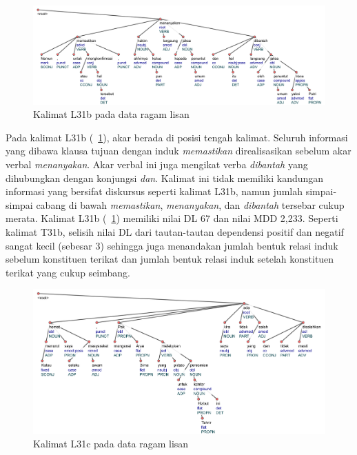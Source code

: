 \begin{figure}
	\centering \includegraphics[width=1
	\textwidth] {pics/ls16.jpg} 
	\caption{Kalimat L31b pada data ragam lisan}
	\label{fig:ls16} 
\end{figure}

Pada kalimat L31b (\pic~\ref{fig:ls16}), akar berada di posisi tengah kalimat. Seluruh informasi yang dibawa klausa tujuan dengan induk \textit{memastikan} direalisasikan sebelum akar verbal \textit{menanyakan}. Akar verbal ini juga mengikat verba \textit{dibantah} yang dihubungkan dengan konjungsi \textit{dan}. Kalimat ini tidak memiliki kandungan informasi yang bersifat diskursus seperti kalimat L31b, namun jumlah simpai-simpai cabang di bawah \textit{memastikan}, \textit{menanyakan}, dan \textit{dibantah} tersebar cukup merata. Kalimat L31b (\pic~\ref{fig:ls16}) memiliki nilai DL 67 dan nilai MDD 2,233. Seperti kalimat T31b, selisih nilai DL dari tautan-tautan dependensi positif dan negatif sangat kecil (sebesar 3) sehingga juga menandakan jumlah bentuk relasi induk sebelum konstituen terikat dan jumlah bentuk relasi induk setelah konstituen terikat yang cukup seimbang. 

\begin{figure}
	\centering \includegraphics[width=1
	\textwidth] {pics/ls114.jpg} 
	\caption{Kalimat L31c pada data ragam lisan}
	\label{fig:ls114} 
\end{figure}

